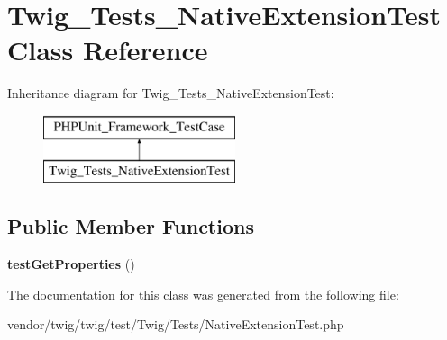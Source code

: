 \hypertarget{classTwig__Tests__NativeExtensionTest}{}\section{Twig\+\_\+\+Tests\+\_\+\+Native\+Extension\+Test Class Reference}
\label{classTwig__Tests__NativeExtensionTest}
Inheritance diagram for Twig\+\_\+\+Tests\+\_\+\+Native\+Extension\+Test\+:\begin{figure}[H]
\begin{center}
\leavevmode
\includegraphics[height=2.000000cm]{classTwig__Tests__NativeExtensionTest}
\end{center}
\end{figure}
\subsection*{Public Member Functions}
\begin{DoxyCompactItemize}
\item 
{\bfseries test\+Get\+Properties} ()\hypertarget{classTwig__Tests__NativeExtensionTest_a539e92d3a662dd334eb0dc28a8bbff8e}{}\label{classTwig__Tests__NativeExtensionTest_a539e92d3a662dd334eb0dc28a8bbff8e}

\end{DoxyCompactItemize}


The documentation for this class was generated from the following file\+:\begin{DoxyCompactItemize}
\item 
vendor/twig/twig/test/\+Twig/\+Tests/Native\+Extension\+Test.\+php\end{DoxyCompactItemize}

